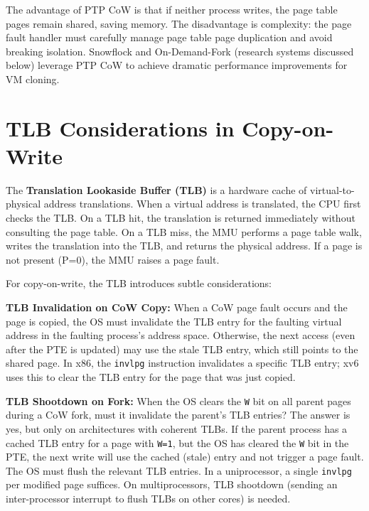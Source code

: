 \documentclass[11pt]{article}
\begin{document}
The advantage of PTP CoW is that if neither process writes, the page table pages remain shared, saving memory. The disadvantage is complexity: the page fault handler must carefully manage page table page duplication and avoid breaking isolation. Snowflock and On-Demand-Fork (research systems discussed below) leverage PTP CoW to achieve dramatic performance improvements for VM cloning.

\section{TLB Considerations in Copy-on-Write}

The \textbf{Translation Lookaside Buffer (TLB)} is a hardware cache of virtual-to-physical address translations. When a virtual address is translated, the CPU first checks the TLB. On a TLB hit, the translation is returned immediately without consulting the page table. On a TLB miss, the MMU performs a page table walk, writes the translation into the TLB, and returns the physical address. If a page is not present (P=0), the MMU raises a page fault.

For copy-on-write, the TLB introduces subtle considerations:

\textbf{TLB Invalidation on CoW Copy:} When a CoW page fault occurs and the page is copied, the OS must invalidate the TLB entry for the faulting virtual address in the faulting process's address space. Otherwise, the next access (even after the PTE is updated) may use the stale TLB entry, which still points to the shared page. In x86, the \texttt{invlpg} instruction invalidates a specific TLB entry; xv6 uses this to clear the TLB entry for the page that was just copied.

\textbf{TLB Shootdown on Fork:} When the OS clears the \texttt{W} bit on all parent pages during a CoW fork, must it invalidate the parent's TLB entries? The answer is yes, but only on architectures with coherent TLBs. If the parent process has a cached TLB entry for a page with \texttt{W=1}, but the OS has cleared the \texttt{W} bit in the PTE, the next write will use the cached (stale) entry and not trigger a page fault. The OS must flush the relevant TLB entries. In a uniprocessor, a single \texttt{invlpg} per modified page suffices. On multiprocessors, TLB shootdown (sending an inter-processor interrupt to flush TLBs on other cores) is needed.
\end{document}
